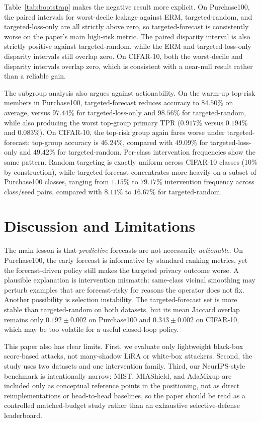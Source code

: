 \documentclass{article}
\newcommand{\purch}{Purchase100}
\newcommand{\cifar}{CIFAR-10}
\begin{document}
Table~\ref{tab:bootstrap} makes the negative result more explicit. On \purch{}, the paired intervals for worst-decile leakage against ERM, targeted-random, and targeted-loss-only are all strictly above zero, so targeted-forecast is consistently worse on the paper's main high-risk metric. The paired disparity interval is also strictly positive against targeted-random, while the ERM and targeted-loss-only disparity intervals still overlap zero. On \cifar{}, both the worst-decile and disparity intervals overlap zero, which is consistent with a near-null result rather than a reliable gain.

The subgroup analysis also argues against actionability. On the warm-up top-risk members in \purch{}, targeted-forecast reduces accuracy to $84.50$\% on average, versus $97.44$\% for targeted-loss-only and $98.56$\% for targeted-random, while also producing the worst top-group primary TPR ($0.917$\% versus $0.194$\% and $0.083$\%). On \cifar{}, the top-risk group again fares worse under targeted-forecast: top-group accuracy is $46.24$\%, compared with $49.09$\% for targeted-loss-only and $49.42$\% for targeted-random. Per-class intervention frequencies show the same pattern. Random targeting is exactly uniform across CIFAR-10 classes (10\% by construction), while targeted-forecast concentrates more heavily on a subset of Purchase100 classes, ranging from $1.15$\% to $79.17$\% intervention frequency across class/seed pairs, compared with $8.11$\% to $16.67$\% for targeted-random.

\section{Discussion and Limitations}
\label{sec:discussion}

The main lesson is that \emph{predictive} forecasts are not necessarily \emph{actionable}. On \purch{}, the early forecast is informative by standard ranking metrics, yet the forecast-driven policy still makes the targeted privacy outcome worse. A plausible explanation is intervention mismatch: same-class vicinal smoothing may perturb examples that are forecast-risky for reasons the operator does not fix. Another possibility is selection instability. The targeted-forecast set is more stable than targeted-random on both datasets, but its mean Jaccard overlap remains only $0.192\pm0.002$ on \purch{} and $0.343\pm0.002$ on \cifar{}, which may be too volatile for a useful closed-loop policy.

This paper also has clear limits. First, we evaluate only lightweight black-box score-based attacks, not many-shadow LiRA or white-box attackers. Second, the study uses two datasets and one intervention family. Third, our NeurIPS-style benchmark is intentionally narrow: MIST, MIAShield, and AdaMixup are included only as conceptual reference points in the positioning, not as direct reimplementations or head-to-head baselines, so the paper should be read as a controlled matched-budget study rather than an exhaustive selective-defense leaderboard.
\end{document}
